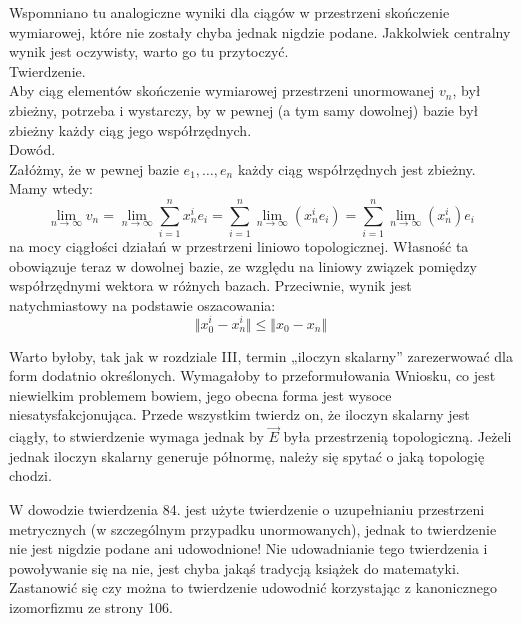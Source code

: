 \documentclass[a4paper,11pt]{article}
\begin{document}
\start {} Wspomniano tu analogiczne wyniki dla ciągów w
przestrzeni skończenie wymiarowej, które nie zostały chyba jednak
nigdzie podane. Jakkolwiek centralny wynik jest oczywisty, warto
go tu przytoczyć. \\
Twierdzenie. \\
Aby ciąg elementów skończenie wymiarowej przestrzeni unormowanej
$v_{ n }$, był zbieżny, potrzeba i wystarczy, by w pewnej (a tym samy
dowolnej) bazie był zbieżny każdy ciąg jego
współrzędnych. \\
Dowód. \\
Załóżmy, że w pewnej bazie $e_{ 1 }, \ldots, e_{ n }$ każdy ciąg
współrzędnych jest zbieżny. Mamy wtedy:
\begin{equation}
  \label{eq:SchwartzKAMVolI-01}
  \lim_{ n \to \infty } v_{ n }
  =
  \lim_{ n \to \infty } \sum_{ i = 1 }^{ n } x_{ n }^{ i } e_{ i }
  =
  \sum_{ i = 1 }^{ n } \lim_{ n \to \infty }( x_{ n }^{ i } e_{ i } )
  =
  \sum_{ i = 1 }^{ n } \lim_{ n \to \infty }( x_{ n }^{ i } ) e_{ i }
\end{equation}
na mocy ciągłości działań w przestrzeni liniowo topologicznej.
Własność ta obowiązuje teraz w dowolnej bazie, ze względu na liniowy
związek pomiędzy współrzędnymi wektora w różnych bazach. Przeciwnie,
wynik jest natychmiastowy na podstawie oszacowania:
\begin{equation}
  \label{eq:SchwartzKAMVolI-02}
  \Vert x_{ 0 }^{ i } - x_{ n }^{ i } \Vert \leq \Vert x_{ 0 } - x_{ n } \Vert
\end{equation}

\vspace{\spaceFour}


\start {} Warto byłoby, tak jak w rozdziale III, termin
„iloczyn skalarny” zarezerwować dla form dodatnio określonych.
Wymagałoby to przeformułowania Wniosku, co jest niewielkim problemem
bowiem, jego obecna forma jest wysoce niesatysfakcjonująca. Przede
wszystkim twierdz on, że iloczyn skalarny jest ciągły, to stwierdzenie
wymaga jednak by $\vec{ E }$ była przestrzenią topologiczną. Jeżeli
jednak iloczyn skalarny generuje półnormę, należy się spytać o jaką
topologię chodzi.

\vspace{\spaceFour}


\start {} W dowodzie twierdzenia 84. jest użyte twierdzenie o
uzupełnianiu przestrzeni metrycznych (w szczególnym przypadku
unormowanych), jednak to twierdzenie nie jest nigdzie podane ani
udowodnione! Nie udowadnianie tego twierdzenia i powoływanie się na
nie, jest chyba jakąś tradycją książek do matematyki. Zastanowić się
czy można to twierdzenie udowodnić korzystając z kanonicznego
izomorfizmu ze strony 106.
\end{document}
